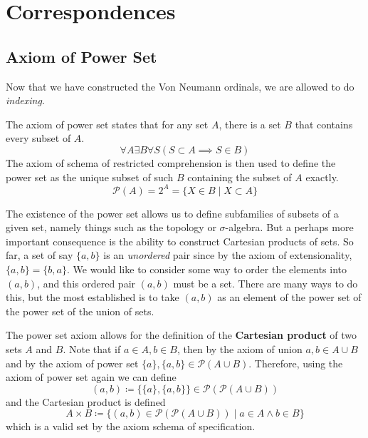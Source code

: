 \section{Correspondences} 

\subsection{Axiom of Power Set}

  Now that we have constructed the Von Neumann ordinals, we are allowed to do \textit{indexing}. 

  \begin{axiom}
    \label{power-set-axiom}
    The axiom of power set states that for any set $A$, there is a set $B$ that contains every subset of $A$. 
    \begin{equation}
      \forall A \exists B \forall S (S \subset A \implies S \in B)
    \end{equation}
    The axiom of schema of restricted comprehension is then used to define the power set as the unique subset of such $B$ containing the subset of $A$ exactly. 
    \begin{equation}
      \mathcal{P}(A) = 2^A = \{X \in B \mid X \subset A \}
    \end{equation}
  \end{axiom} 

  The existence of the power set allows us to define subfamilies of subsets of a given set, namely things such as the topology or $\sigma$-algebra. But a perhaps more important consequence is the ability to construct Cartesian products of sets. So far, a set of say $\{a, b\}$ is an \textit{unordered} pair since by the axiom of extensionality, $\{a, b\} = \{b, a\}$. We would like to consider some way to order the elements into $(a, b)$, and this ordered pair $(a, b)$ must be a set. There are many ways to do this, but the most established is to take $(a, b)$ as an element of the power set of the power set of the union of sets. 

  \begin{definition}
    \label{def:cart-prod}
    The power set axiom allows for the definition of the \textbf{Cartesian product} of two sets $A$ and $B$. Note that if $a \in A, b \in B$, then by the axiom of union $a, b \in A \cup B$ and by the axiom of power set $\{a\}, \{a, b\} \in \mathcal{P}(A \cup B)$. Therefore, using the axiom of power set again we can define
    \begin{equation}
      (a, b) \coloneqq \{\{a\}, \{a, b\}\} \in \mathcal{P}(\mathcal{P}(A \cup B))
    \end{equation} 
    and the Cartesian product is defined 
    \begin{equation}
      A \times B \coloneqq \{ (a, b) \in \mathcal{P}(\mathcal{P}(A \cup B)) \mid a \in A \land b \in B \}
    \end{equation}
    which is a valid set by the axiom schema of specification. 
  \end{definition} 


